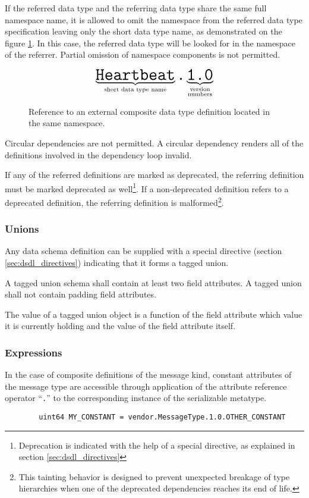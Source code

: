 If the referred data type and the referring data type share the same full namespace name,
it is allowed to omit the namespace from the referred data type specification
leaving only the short data type name, as demonstrated on the figure \ref{fig:dsdl_nested_reference_short}.
In this case, the referred data type will be looked for in the namespace of the referrer.
Partial omission of namespace components is not permitted.

\begin{figure}[H]
    $$
    \underbrace{\texttt{\huge{Heartbeat}}}_{\text{short data type name}}%
    \texttt{\huge{.}}%
    \underbrace{\texttt{\huge{1.0}}}_{\substack{\text{version} \\ \text{numbers}}}%
    $$
    \caption{Reference to an external composite data type definition located in the same namespace.
    \label{fig:dsdl_nested_reference_short}}
\end{figure}

Circular dependencies are not permitted.
A circular dependency renders all of the definitions involved in the dependency loop invalid.

If any of the referred definitions are marked as deprecated,
the referring definition must be marked deprecated as well\footnote{%
Deprecation is indicated with the help of a special directive, as explained in section \ref{sec:dsdl_directives}}.
If a non-deprecated definition refers to a deprecated definition,
the referring definition is malformed\footnote{%
This tainting behavior is designed to prevent unexpected breakage of
type hierarchies when one of the deprecated dependencies reaches its end of life.}.

\subsubsection{Unions}\label{sec:dsdl_composite_tagged_unions}

Any data schema definition can be supplied with a special directive (section \ref{sec:dsdl_directives})
indicating that it forms a tagged union.

A tagged union schema shall contain at least two field attributes.
A tagged union shall not contain padding field attributes.

The value of a tagged union object is a function of the field attribute which value it is currently holding
and the value of the field attribute itself.

\subsubsection{Expressions}

In the case of composite definitions of the message kind,
constant attributes of the message type are accessible through application of the
attribute reference operator ``\verb|.|'' to the corresponding instance of the serializable metatype.

\begin{remark}
    \begin{verbatim}
        uint64 MY_CONSTANT = vendor.MessageType.1.0.OTHER_CONSTANT
    \end{verbatim}
\end{remark}

